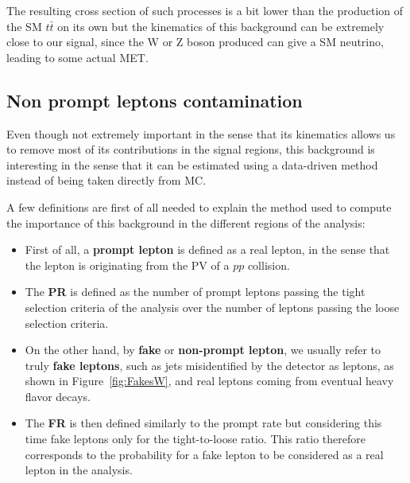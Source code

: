 \documentclass[a4paper, 10pt, openright]{report}
\begin{document}
The resulting cross section of such processes is a bit lower than the production of the \ac{SM} $t \bar t$ on its own but the kinematics of this background can be extremely close to our signal, since the W or Z boson produced can give a \ac{SM} neutrino, leading to some actual \ac{MET}.

\subsection{Non prompt leptons contamination} \label{subsection:Fakes}

Even though not extremely important in the sense that its kinematics allows us to remove most of its contributions in the signal regions, this background is interesting in the sense that it can be estimated using a data-driven method instead of being taken directly from \ac{MC}.

A few definitions are first of all needed to explain the method used to compute the importance of this background in the different regions of the analysis:
\begin{itemize}
\item First of all, a \textbf{prompt lepton} is defined as a real lepton, in the sense that the lepton is originating from the \ac{PV} of a $pp$ collision.
\item The \textbf{\ac{PR}} is defined as the number of prompt leptons passing the tight selection criteria of the analysis over the number of leptons passing the loose selection criteria. 
\item On the other hand, by \textbf{fake} or \textbf{non-prompt lepton}, we usually refer to truly \textbf{fake leptons}, such as jets misidentified by the detector as leptons, as shown in Figure~\ref{fig:FakesW}, and real leptons coming from eventual heavy flavor decays.
\item The \textbf{\ac{FR}} is then defined similarly to the prompt rate but considering this time fake leptons only for the tight-to-loose ratio. This ratio therefore corresponds to the probability for a fake lepton to be considered as a real lepton in the analysis.
\end{itemize}
\end{document}
